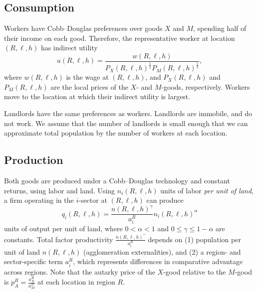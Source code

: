 \documentclass[12pt]{article}
\begin{document}
\subsection{Consumption}

Workers have Cobb--Douglas preferences over goods $X$ and $M$, spending half
of their income on each good. Therefore, the representative worker at
location $\left( R,\ell ,h\right) $ has indirect utility%
\begin{equation}
u\left( R,\ell ,h\right) =\frac{w\left( R,\ell ,h\right) }{P_{X}\left(
R,\ell ,h\right) ^{\frac{1}{2}}P_{M}\left( R,\ell ,h\right) ^{\frac{1}{2}}},
\end{equation}%
where $w\left( R,\ell ,h\right) $ is the wage at $\left( R,\ell ,h\right) $,
and $P_{X}\left( R,\ell ,h\right) $ and $P_{M}\left( R,\ell ,h\right) $ are
the local prices of the $X$- and $M$-goods, respectively. Workers move to 
the location at which their indirect utility is largest.

Landlords have the same preferences as workers. Landlords are immobile, and
do not work. We assume that the number of landlords is small enough that we
can approximate total population by the number of workers at each location.

\subsection{Production}

Both goods are produced under a Cobb--Douglas technology and constant returns, using labor and
land. Using $n_{i} \left( R, \ell, h \right)$ units of labor \textit{per unit of land}, 
a firm operating in the $i$-sector at $\left( R, \ell, h \right)$ can produce
\begin{equation*}
q_{i} \left( R, \ell, h \right) = \frac{n \left( R, \ell, h \right)^{\gamma}}{a_{i}^{R}} 
n_{i} \left( R, \ell, h \right)^{\alpha}
\end{equation*}
units of output per unit of land, where $0 < \alpha < 1$ and $0 \leq \gamma \leq 1-\alpha$ are constants. Total factor productivity
$\frac{n \left( R, \ell, h \right)^{\gamma}}{a_{i}^{R}}$ depends on (1) population 
per unit of land $n \left( R, \ell, h \right)$ (agglomeration externalities), and (2) 
a region- and sector-specific term $a_{i}^{R}$, which represents differences in 
comparative advantage across regions. Note that the
autarky price of the $X$-good relative to the $M$-good is $%
p_{A}^{R}=\frac{a_{X}^{R}}{a_{M}^{R}}$ at each location in region $R$.
\end{document}
